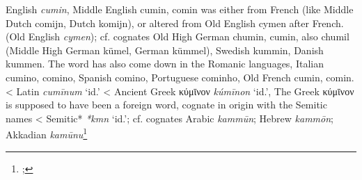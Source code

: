 \begin{etymology}\label{ety:cumin}
English \textit{cumin}, Middle English cumin, comin was either from French (like Middle Dutch comijn, Dutch komijn), or altered from Old English cymen after French. (Old English \textit{cymen}); cf. cognates Old High German chumin, cumin, also chumil (Middle High German kümel, German kümmel), Swedish kummin, Danish kummen. The word has also come down in the Romanic languages, Italian cumino, comino, Spanish comino, Portuguese cominho, Old French cumin, comin. 
< Latin \textit{cumīnum} `id.'
< Ancient Greek {κύμῑνον} \textit{kúmīnon} `id.', The Greek κύμῑνον is supposed to have been a foreign word, cognate in origin with the Semitic names
< Semitic* \textit{*kmn} `id.'; cf. cognates Arabic \textit{kammūn}; Hebrew \textit{kammōn}; Akkadian \textit{kamūnu}\footnote{\textcite[cumin]{oed}; }
\end{etymology}